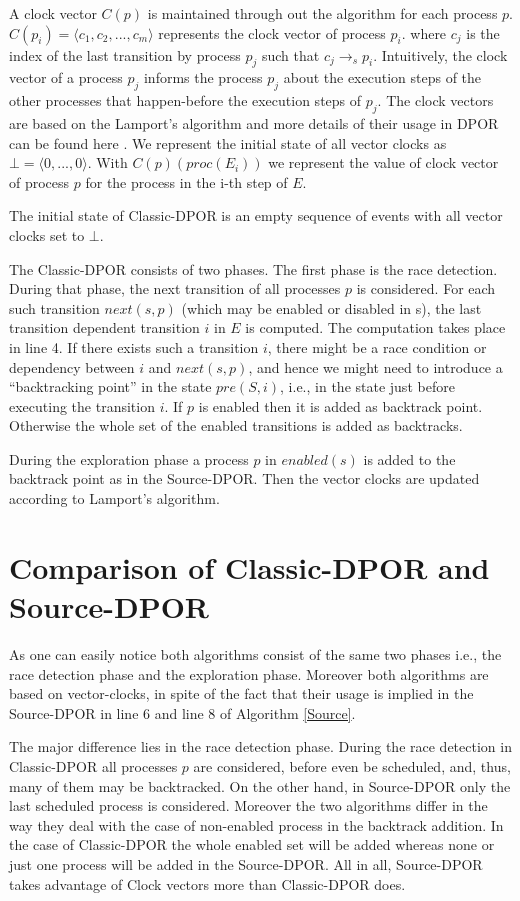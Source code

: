 A clock vector $C(p)$ is maintained through out the algorithm for each process $p$. $C(p_i) = \langle c_1, c_2, ..., c_m \rangle$ represents the clock vector of process $p_i$.
where $c_j$ is the index of the last transition by process $p_j$ such that
$c_j \rightarrow_s p_i$. Intuitively, the clock vector of a process $p_j$ informs the process $p_j$ about the execution steps of the other processes that 
happen-before the execution steps of $p_j$. The clock vectors are based on the Lamport's algorithm \cite{Lamp} and more details of their usage in DPOR can
be found here \cite{FlanaganDPOR}. We represent the initial state of all vector clocks as $\bot = \langle 0, ..., 0 \rangle$. With $C(p)(proc(E_i ))$ we represent the 
value of clock vector of process $p$ for the process in the i-th step of $E$.

The initial state of Classic-DPOR is an empty sequence of events with all vector clocks set to $\bot$.

The Classic-DPOR consists of two phases. The first phase is the race detection. During that phase, the next transition
of all processes $p$ is considered.
For each such transition $next(s, p)$ (which may be enabled or disabled
in s), the last transition dependent transition  $i$ in $E$ is computed.
The computation takes place in line 4.
If there exists such a transition $i$, there might be a race
condition or dependency between $i$ and $next(s, p)$, and hence
we might need to introduce a “backtracking point” in the
state $pre(S, i)$, i.e., in the state just before executing the
transition $i$. If $p$ is enabled then it is added as backtrack point. Otherwise the whole set of the 
enabled transitions is added as backtracks.

During the exploration phase a process $p$ in $enabled(s)$ is added to the backtrack point as in the Source-DPOR. 
Then the vector clocks are updated according to Lamport's algorithm.

\section{Comparison of Classic-DPOR and Source-DPOR}

As one can easily notice both algorithms consist of the same two phases i.e., the race detection phase and the exploration phase. Moreover both
algorithms are based on vector-clocks, in spite of the fact that their usage is implied in the Source-DPOR in line 6 and line 8 of Algorithm \ref{Source}.

The major difference lies in the race detection phase. During the race detection in Classic-DPOR all processes $p$ are considered, before even be scheduled, and, thus, many of them
may be backtracked. On the other hand, in Source-DPOR only the last scheduled process is considered. Moreover the two algorithms differ in the way they deal with
the case of non-enabled process in the backtrack addition. In the case of Classic-DPOR the whole enabled set will be added whereas none or just one process will
be added in the Source-DPOR. All in all, Source-DPOR takes advantage of Clock vectors more than Classic-DPOR does.

